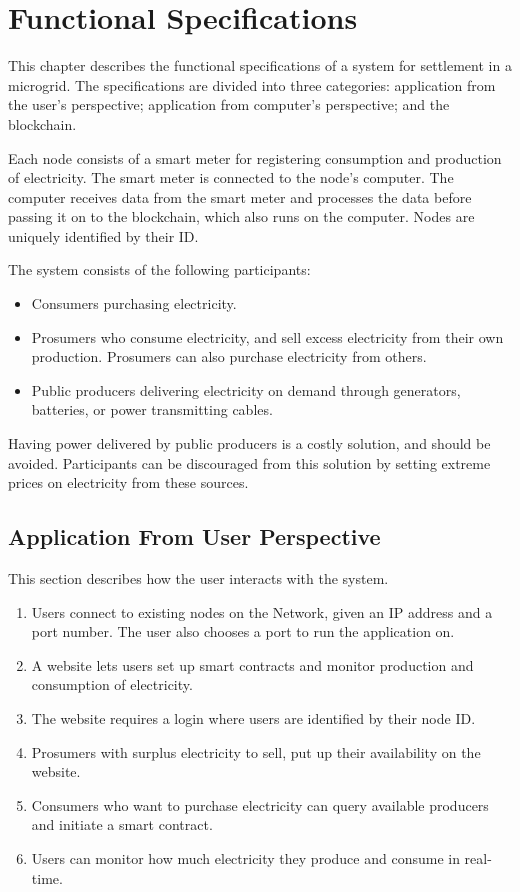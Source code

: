 \chapter{Functional Specifications} 
This chapter describes the functional specifications of a system for settlement in a microgrid. The specifications are divided into three categories: application from the user's perspective; application from computer's perspective; and the blockchain.

Each node consists of a smart meter for registering consumption and production of electricity. The smart meter is connected to the node's computer. The computer receives data from the smart meter and processes the data before passing it on to the blockchain, which also runs on the computer. Nodes are uniquely identified by their ID.  

The system consists of the following participants:

\begin{itemize}
\item Consumers purchasing electricity.
\item Prosumers who consume electricity, and sell excess electricity from their own production. Prosumers can also purchase electricity from others.
\item Public producers delivering electricity on demand through generators, batteries, or power transmitting cables. 
\end{itemize}

Having power delivered by public producers is a costly solution, and should be avoided. Participants can be discouraged from this solution by setting extreme prices on electricity from these sources.

\section{Application From User Perspective} \label{user}
This section describes how the user interacts with the system.

\begin{enumerate}
\item Users connect to existing nodes on the Network, given an IP address and a port number. The user also chooses a port to run the application on. 
\item A website lets users set up smart contracts and monitor production and consumption of electricity. 
\item The website requires a login where users are identified by their node ID. 
\item Prosumers with surplus electricity to sell, put up their availability on the website.
\item Consumers who want to purchase electricity can query available producers and initiate a smart contract.
\item Users can monitor how much electricity they produce and consume in real-time.
\end{enumerate}

